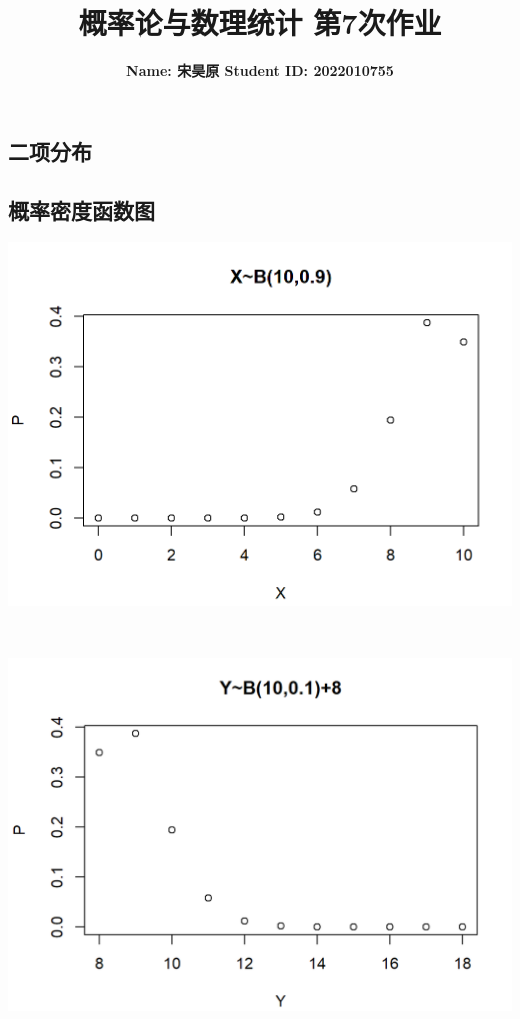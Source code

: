 \documentclass{article}
\title{\bf\Large  概率论与数理统计 第7次作业}
\author{\bf Name: 宋昊原 \qquad Student ID: 2022010755}
\begin{document}
\begin{CJK}{UTF8}{gbsn}
\maketitle
\section{二项分布}
\subsection{概率密度函数图}
\begin{minipage}{0.5\textwidth}
    \includegraphics[scale=0.6]{plot1X.png}
\end{minipage}
\\
\begin{minipage}{0.5\textwidth}
    \includegraphics[scale=0.6]{plot1Y.png}
\end{minipage}

\end{CJK}
\end{document}
